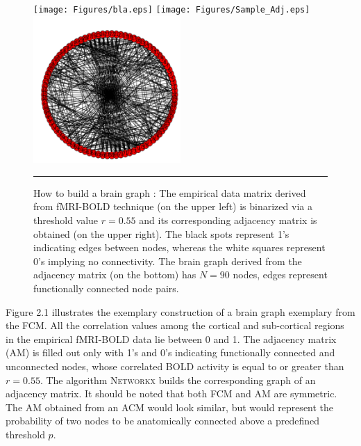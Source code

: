 \begin{figure}[htbp]
  \centering
	 \texttt{[image: Figures/bla.eps]} 
	 \texttt{[image: Figures/Sample\_Adj.eps]} 
	 \includegraphics[width=0.50\textwidth]{Figures/brain_graph.png}  
  
    
    \rule{35em}{0.5pt}
  \caption[Binarizing via thresholding]{How to build a brain graph : The empirical data matrix derived from fMRI-BOLD technique (on the upper left) is binarized via a threshold value $r=0.55$ and its corresponding adjacency matrix is obtained (on the upper right). The black spots represent 1's indicating edges between nodes, whereas the white squares represent 0's implying no connectivity. The brain graph derived from the adjacency matrix (on the bottom) has $N=90$ nodes, edges represent functionally connected node pairs.}
  \label{fig:Binarizing via thresholding}
\end{figure}

Figure 2.1 illustrates the exemplary construction of a brain graph exemplary from the FCM. All the correlation values among the cortical and sub-cortical regions in the empirical fMRI-BOLD data lie between 0 and 1. The adjacency matrix (AM) is filled out only with 1's and 0's indicating functionally connected and unconnected nodes, whose correlated BOLD activity is equal to or greater than $r=0.55$. The algorithm \textsc{Networkx} builds the corresponding graph of an adjacency matrix. It should be noted that both FCM and AM are symmetric. The AM obtained from an ACM would look similar, but would represent the probability of two nodes to be anatomically connected above a predefined threshold $p$. 

